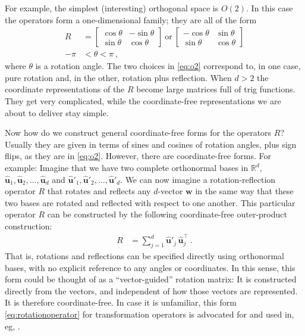 \documentclass{article}
\newcommand{\Evec}[1]{{\mathbf{#1}}} %
\newcommand{\Ehat}[1]{{\mathbf{\hat{#1}}}} %
\begin{document}
For example, the simplest (interesting) orthogonal space is $O(2)$. In this case the operators form a one-dimensional family; they are all of the form
\begin{align}
    R &= \begin{bmatrix}\cos{\theta} & -\sin{\theta} \\ \sin{\theta} & \cos{\theta}\end{bmatrix} ~\mbox{or}~
    \begin{bmatrix}-\cos{\theta} & \sin{\theta} \\ \sin{\theta} & \cos{\theta}\end{bmatrix} \label{eq:o2}
    \\
    -\pi &< \theta < \pi ~, \nonumber
\end{align}
where $\theta$ is a rotation angle.
The two choices in \eqref{eq:o2} correspond to, in one case, pure rotation and, in the other, rotation plus reflection.
When $d>2$ the coordinate representations of the $R$ become large matrices full of trig functions.
They get very complicated, while the coordinate-free representations we are about to deliver stay simple.

Now how do we construct general coordinate-free forms for the operators $R$?
Usually they are given in terms of sines and cosines of rotation angles, plus sign flips, as they are in \eqref{eq:o2}.
However, there are coordinate-free forms.
For example: Imagine that we have two complete orthonormal bases in $\mathbb{R}^d$, $\Ehat{u}_1,\Ehat{u}_2,\ldots,\Ehat{u}_d$ and $\Ehat{u}'_1,\Ehat{u}'_2,\ldots,\Ehat{u}'_d$.
We can now imagine a rotation-reflection operator $R$ that rotates and reflects any $d$-vector $\Evec{w}$ in the same way that these two bases are rotated and reflected with respect to one another.
This particular operator $R$ can be constructed by the following coordinate-free outer-product construction:
\begin{align}
    R &= \sum_{j=1}^d \Ehat{u}'_j\,\Ehat{u}_j^\top ~.\label{eq:rotationoperator}
\end{align}
That is, rotations and reflections can be specified directly using orthonormal bases, with no explicit reference to any angles or coordinates.
In this sense, this form could be thought of as a ``vector-guided'' rotation matrix:
It is constructed directly from the vectors, and independent of how those vectors are represented.
It is therefore coordinate-free.
In case it is unfamiliar, this form \eqref{eq:rotationoperator} for transformation operators is advocated for and used in, eg, \cite{kusse}.
\end{document}
